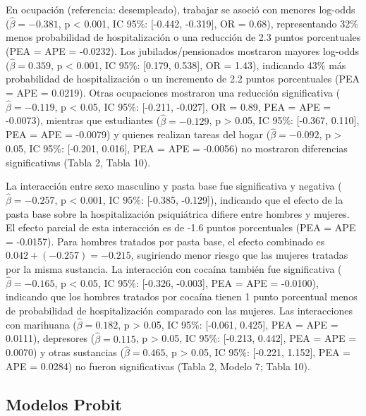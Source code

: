 \documentclass[
  spanish,
  10pt,
]{article}
\begin{document}
En ocupación (referencia: desempleado), trabajar se asoció con menores
log-odds (\(\hat{\beta} = -0.381\), p \textless{} 0.001, IC 95\%:
{[}-0.442, -0.319{]}, OR = 0.68), representando 32\% menos probabilidad
de hospitalización o una reducción de 2.3 puntos porcentuales (PEA = APE
= -0.0232). Los jubilados/pensionados mostraron mayores log-odds
(\(\hat{\beta} = 0.359\), p \textless{} 0.001, IC 95\%: {[}0.179,
0.538{]}, OR = 1.43), indicando 43\% más probabilidad de hospitalización
o un incremento de 2.2 puntos porcentuales (PEA = APE = 0.0219). Otras
ocupaciones mostraron una reducción significativa
(\(\hat{\beta} = -0.119\), p \textless{} 0.05, IC 95\%: {[}-0.211,
-0.027{]}, OR = 0.89, PEA = APE = -0.0073), mientras que estudiantes
(\(\hat{\beta} = -0.129\), p \textgreater{} 0.05, IC 95\%: {[}-0.367,
0.110{]}, PEA = APE = -0.0079) y quienes realizan tareas del hogar
(\(\hat{\beta} = -0.092\), p \textgreater{} 0.05, IC 95\%: {[}-0.201,
0.016{]}, PEA = APE = -0.0056) no mostraron diferencias significativas
(Tabla 2, Tabla 10).

La interacción entre sexo masculino y pasta base fue significativa y
negativa (\(\hat{\beta} = -0.257\), p \textless{} 0.001, IC 95\%:
{[}-0.385, -0.129{]}), indicando que el efecto de la pasta base sobre la
hospitalización psiquiátrica difiere entre hombres y mujeres. El efecto
parcial de esta interacción es de -1.6 puntos porcentuales (PEA = APE =
-0.0157). Para hombres tratados por pasta base, el efecto combinado es
\(0.042 + (-0.257) = -0.215\), sugiriendo menor riesgo que las mujeres
tratadas por la misma sustancia. La interacción con cocaína también fue
significativa (\(\hat{\beta} = -0.165\), p \textless{} 0.05, IC 95\%:
{[}-0.326, -0.003{]}, PEA = APE = -0.0100), indicando que los hombres
tratados por cocaína tienen 1 punto porcentual menos de probabilidad de
hospitalización comparado con las mujeres. Las interacciones con
marihuana (\(\hat{\beta} = 0.182\), p \textgreater{} 0.05, IC 95\%:
{[}-0.061, 0.425{]}, PEA = APE = 0.0111), depresores
(\(\hat{\beta} = 0.115\), p \textgreater{} 0.05, IC 95\%: {[}-0.213,
0.442{]}, PEA = APE = 0.0070) y otras sustancias
(\(\hat{\beta} = 0.465\), p \textgreater{} 0.05, IC 95\%: {[}-0.221,
1.152{]}, PEA = APE = 0.0284) no fueron significativas (Tabla 2, Modelo
7; Tabla 10).

\subsection{Modelos Probit}\label{modelos-probit}
\end{document}
